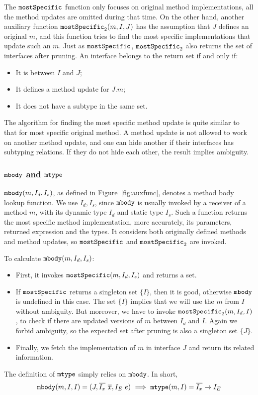 The $\texttt{mostSpecific}$ function only focuses on original method implementations, all the method updates are omitted during that time. On the other hand, another auxiliary function $\texttt{mostSpecific}_2(m, I, J)$ has the assumption that $J$ defines an original $m$, and this function tries to find the most specific implementations that update such an $m$. Just as $\texttt{mostSpecific}$, $\texttt{mostSpecific}_2$ also returns the set of interfaces after pruning. An interface belongs to the return set if and only if:
\begin{itemize}
	\item It is between $I$ and $J$;
	\item It defines a method update for $J.m$;
	\item It does not have a subtype in the same set.
\end{itemize}
The algorithm for finding the most specific method update is quite similar to that for most specific original method. A method update is not allowed to work on another method update, and one can hide another if their interfaces has subtyping relations. If they do not hide each other, the result implies ambiguity.

\subsubsection{$\texttt{mbody}$ and $\texttt{mtype}$}

$\texttt{mbody}(m, I_d, I_s)$, as defined in Figure~\ref{fig:auxfunc}, denotes a method body lookup function.
We use $I_d, I_s$, since $\texttt{mbody}$ is usually invoked by a receiver of a method $m$, with its dynamic
type $I_d$ and static type $I_s$. Such a function returns the most specific method implementation, more
accurately, its parameters, returned expression and the types. It considers both originally defined methods and method updates, so $\texttt{mostSpecific}$ and $\texttt{mostSpecific}_2$ are invoked.

To calculate $\texttt{mbody}(m, I_d, I_s)$:
\begin{itemize}
	\item First, it invokes $\texttt{mostSpecific}(m, I_d, I_s)$ and returns a set.
	\item If $\texttt{mostSpecific}$ returns a singleton set $\{I\}$, then it is good, otherwise $\texttt{mbody}$ is undefined in
	this case. The set $\{I\}$ implies that we will use the $m$ from $I$ without ambiguity. But moreover, we have to invoke $\texttt{mostSpecific}_2(m, I_d, I)$, to check if there are updated versions of $m$ between $I_d$ and $I$. Again we forbid ambiguity, so the expected set after pruning is also a singleton set $\{J\}$.
	\item Finally, we fetch the implementation of $m$ in interface $J$ and return its related information.
\end{itemize}
The definition of $\texttt{mtype}$ simply relies on $\texttt{mbody}$. In short,
$$\mbody(m, I, I) = (J, \overline{I_x}\ \overline{x}, I_E\ e) \ \Longrightarrow\ \mtype(m, I) = \overline{I_x}\rightarrow I_E$$


